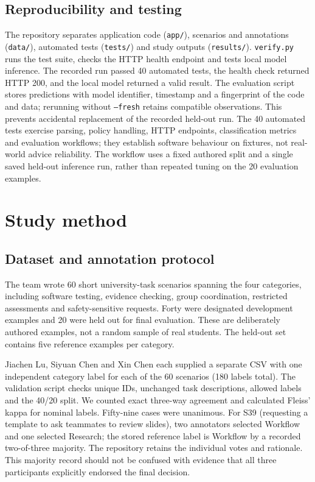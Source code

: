 \documentclass[11pt,a4paper]{article}
\begin{document}
\subsection{Reproducibility and testing}
The repository separates application code (\texttt{app/}), scenarios and annotations (\texttt{data/}), automated tests (\texttt{tests/}) and study outputs (\texttt{results/}). \texttt{verify.py} runs the test suite, checks the HTTP health endpoint and tests local model inference. The recorded run passed 40 automated tests, the health check returned HTTP 200, and the local model returned a valid result. The evaluation script stores predictions with model identifier, timestamp and a fingerprint of the code and data; rerunning without \texttt{--fresh} retains compatible observations. This prevents accidental replacement of the recorded held-out run. The 40 automated tests exercise parsing, policy handling, HTTP endpoints, classification metrics and evaluation workflows; they establish software behaviour on fixtures, not real-world advice reliability. The workflow uses a fixed authored split and a single saved held-out inference run, rather than repeated tuning on the 20 evaluation examples.

\section{Study method}
\subsection{Dataset and annotation protocol}
The team wrote 60 short university-task scenarios spanning the four categories, including software testing, evidence checking, group coordination, restricted assessments and safety-sensitive requests. Forty were designated development examples and 20 were held out for final evaluation. These are deliberately authored examples, not a random sample of real students. The held-out set contains five reference examples per category.

Jiachen Lu, Siyuan Chen and Xin Chen each supplied a separate CSV with one independent category label for each of the 60 scenarios (180 labels total). The validation script checks unique IDs, unchanged task descriptions, allowed labels and the 40/20 split. We counted exact three-way agreement and calculated Fleiss' kappa for nominal labels. Fifty-nine cases were unanimous. For S39 (requesting a template to ask teammates to review slides), two annotators selected Workflow and one selected Research; the stored reference label is Workflow by a recorded two-of-three majority. The repository retains the individual votes and rationale. This majority record should not be confused with evidence that all three participants explicitly endorsed the final decision.
\end{document}
